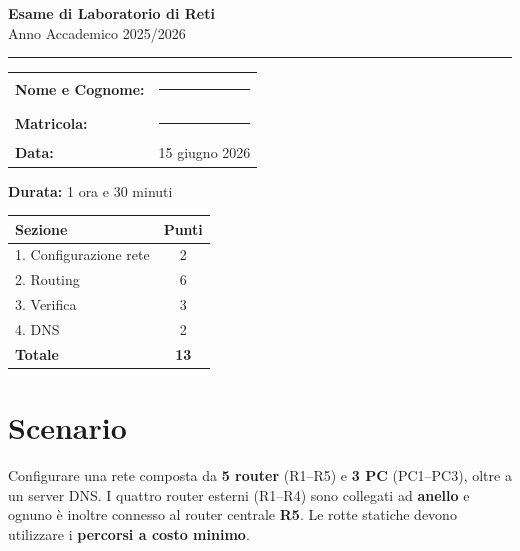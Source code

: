 \documentclass[a4paper,11pt]{article}
\begin{document}
\begin{center}
    {\LARGE \textbf{Esame di Laboratorio di Reti}}\\[0.3cm]
    {\large Anno Accademico 2025/2026}\\[0.3cm]
    \rule{\textwidth}{0.4pt}
\end{center}

\vspace{0.3cm}

\noindent
\begin{tabular}{@{}ll}
    \textbf{Nome e Cognome:} & \rule{8cm}{0.4pt} \\[0.3cm]
    \textbf{Matricola:}      & \rule{4cm}{0.4pt} \\[0.3cm]
    \textbf{Data:}           & 15 giugno 2026    \\
\end{tabular}

\vspace{0.5cm}

\noindent
\begin{minipage}[t]{0.5\textwidth}
    \textbf{Durata:} 1 ora e 30 minuti
\end{minipage}
\begin{minipage}[t]{0.5\textwidth}
    \raggedleft
    \begin{tabular}{|l|c|}
        \hline
        \textbf{Sezione}       & \textbf{Punti} \\
        \hline
        1. Configurazione rete & 2              \\
        2. Routing             & 6              \\
        3. Verifica            & 3              \\
        4. DNS                 & 2              \\
        \hline
        \textbf{Totale}        & \textbf{13}    \\
        \hline
    \end{tabular}
\end{minipage}

\vspace{0.5cm}

\section*{Scenario}

Configurare una rete composta da \textbf{5 router} (R1--R5) e \textbf{3 PC} (PC1--PC3), oltre a un server DNS. I quattro router esterni (R1--R4) sono collegati ad \textbf{anello} e ognuno è inoltre connesso al router centrale \textbf{R5}. Le rotte statiche devono utilizzare i \textbf{percorsi a costo minimo}.
\end{document}
